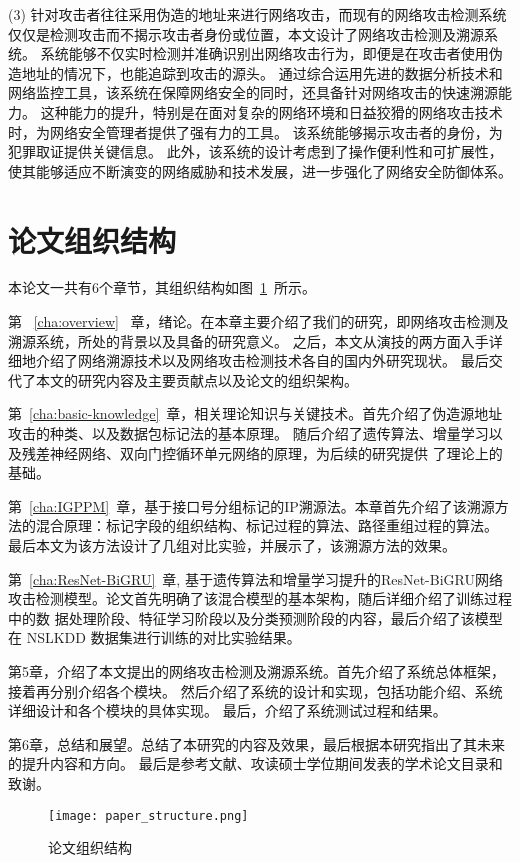 (3)  针对攻击者往往采用伪造的地址来进行网络攻击，而现有的网络攻击检测系统仅仅是检测攻击而不揭示攻击者身份或位置，本文设计了网络攻击检测及溯源系统。
系统能够不仅实时检测并准确识别出网络攻击行为，即便是在攻击者使用伪造地址的情况下，也能追踪到攻击的源头。
通过综合运用先进的数据分析技术和网络监控工具，该系统在保障网络安全的同时，还具备针对网络攻击的快速溯源能力。
这种能力的提升，特别是在面对复杂的网络环境和日益狡猾的网络攻击技术时，为网络安全管理者提供了强有力的工具。
该系统能够揭示攻击者的身份，为犯罪取证提供关键信息。
此外，该系统的设计考虑到了操作便利性和可扩展性，使其能够适应不断演变的网络威胁和技术发展，进一步强化了网络安全防御体系。

\section{论文组织结构}
本论文一共有6个章节，其组织结构如图~\ref{fig:paper_structure}~所示。


第 ~\ref{cha:overview}~ 章，绪论。在本章主要介绍了我们的研究，即网络攻击检测及溯源系统，所处的背景以及具备的研究意义。
之后，本文从演技的两方面入手详细地介绍了网络溯源技术以及网络攻击检测技术各自的国内外研究现状。
最后交代了本文的研究内容及主要贡献点以及论文的组织架构。


第~\ref{cha:basic-knowledge}~章，相关理论知识与关键技术。首先介绍了伪造源地址攻击的种类、以及数据包标记法的基本原理。
随后介绍了遗传算法、增量学习以及残差神经网络、双向门控循环单元网络的原理，为后续的研究提供
了理论上的基础。


第~\ref{cha:IGPPM}~章，基于接口号分组标记的IP溯源法。本章首先介绍了该溯源方法的混合原理：标记字段的组织结构、标记过程的算法、路径重组过程的算法。
最后本文为该方法设计了几组对比实验，并展示了，该溯源方法的效果。


第~\ref{cha:ResNet-BiGRU}~章, 基于遗传算法和增量学习提升的ResNet-BiGRU网络攻击检测模型。论文首先明确了该混合模型的基本架构，随后详细介绍了训练过程中的数
据处理阶段、特征学习阶段以及分类预测阶段的内容，最后介绍了该模型在 NSL\-KDD 数据集进行训练的对比实验结果。


第5章，介绍了本文提出的网络攻击检测及溯源系统。首先介绍了系统总体框架，接着再分别介绍各个模块。
然后介绍了系统的设计和实现，包括功能介绍、系统详细设计和各个模块的具体实现。
最后，介绍了系统测试过程和结果。



第6章，总结和展望。总结了本研究的内容及效果，最后根据本研究指出了其未来的提升内容和方向。
最后是参考文献、攻读硕士学位期间发表的学术论文目录和致谢。
\begin{figure}[htbp]
  \centering
  \texttt{[image: paper\_structure.png]}
  \caption{论文组织结构}
  \label{fig:paper_structure}
\end{figure}